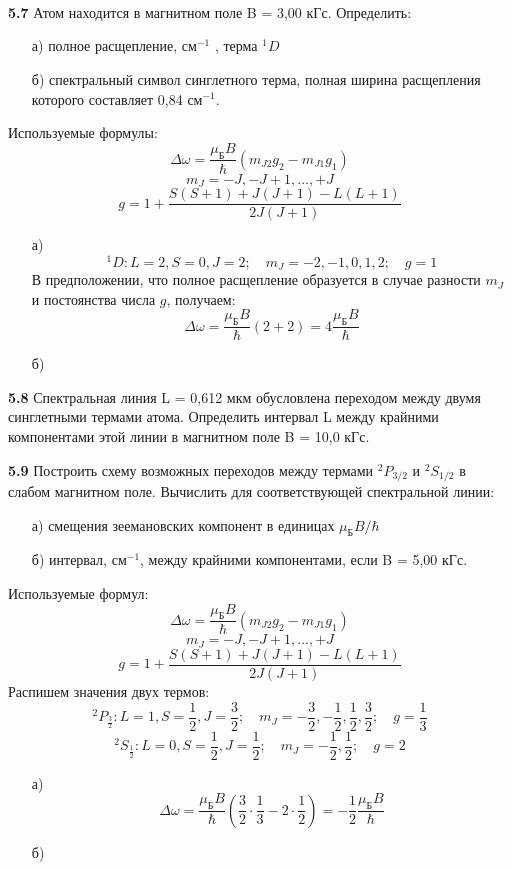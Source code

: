 	\textbf{\\\\\\5.7 }
		Атом находится в магнитном поле B = 3,00 кГс. Определить: 
		\vspace*{-1em}
		\begin{itemize}\itemsep-8pt
			\item[а)] полное расщепление, \( \text{см}^{-1} \) , терма \( ^1D \) 
			\item[б)] спектральный символ синглетного терма,
			полная ширина расщепления которого составляет 0,84 \( \text{см}^{-1} \).
		\end{itemize}
		Используемые формулы: 
		\[ \Delta\omega = \frac{\mu_\text{Б}B}{\hbar}(m_{J2}g_{2}-m_{J1}g_{1}) \]
		\[ m_J = -J, -J+1, ..., +J \]
		\[ g = 1 + \frac{S(S+1)+J(J+1)-L(L+1)}{2J(J+1)} \]
		\begin{itemize}\itemsep-8pt
			\item[а)] 
			\[ 
				^1D: L=2, S=0, J=2;\quad
				m_J = -2, -1, 0, 1, 2;\quad
				g = 1
			\]
			В предположении, что полное расщепление образуется в случае разности
			\( m_J \) и постоянства числа \( g \), получаем:
			\[ 
				\Delta\omega = \frac{\mu_\text{Б}B}{\hbar}(2+2) 
				= 4\frac{\mu_\text{Б}B}{\hbar} 
			\]
			\item[б)]
		\end{itemize}

	\textbf{5.8 }
		Спектральная линия L = 0,612 мкм обусловлена переходом между двумя
		синглетными термами атома. Определить интервал L между крайними
		компонентами этой линии в магнитном поле B = 10,0 кГс.

	\textbf{5.9 }
		Построить схему возможных переходов между термами \( ^2P_{3/2} \) и 
		\( ^2S_{1/2} \) в слабом магнитном поле. Вычислить для соответствующей 
		спектральной линии:
		\vspace*{-2em}
		\begin{itemize}\itemsep-8pt
			\item[а)] смещения зеемановских компонент в единицах 
			\( \mu_\text{Б}B/\hbar \)
			\item[б)] интервал, \( \text{см}^{-1} \), между крайними 
			компонентами, если B = 5,00 кГс.
		\end{itemize}
		Используемые формул:
		\[ \Delta\omega = \frac{\mu_\text{Б}B}{\hbar}(m_{J2}g_{2}-m_{J1}g_{1}) \]
		\[ m_J = -J, -J+1, ..., +J \]
		\[ g = 1 + \frac{S(S+1)+J(J+1)-L(L+1)}{2J(J+1)} \]
		Распишем значения двух термов:
		\[ 
			^2P_\frac{3}{2}: L = 1, S = \frac{1}{2}, J = \frac{3}{2};\quad
			m_J = -\frac{3}{2}, -\frac{1}{2}, \frac{1}{2}, \frac{3}{2};\quad
			g = \frac{1}{3}
		\]
		\[ 
			^2S_\frac{1}{2}: L = 0, S = \frac{1}{2}, J = \frac{1}{2};\quad
			m_J = -\frac{1}{2}, \frac{1}{2};\quad
			g = 2
		\]
		\begin{itemize}\itemsep-8pt
			\item[а)]
			\[ 
				\Delta\omega = \frac{\mu_\text{Б}B}{\hbar}
				(\frac{3}{2}\cdot\frac{1}{3} - 2\cdot\frac{1}{2}) = 
				-\frac{1}{2}\frac{\mu_\text{Б}B}{\hbar}
			\]
			\item[б)]
		\end{itemize}

